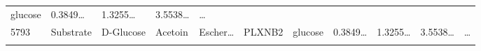 \documentclass[
]{article}
\begin{document}
\begin{longtable}[]{@{}lllllllllll@{}}
\begin{minipage}[t]{0.09\columnwidth}
glucose\strut
\end{minipage} & \begin{minipage}[t]{0.07\columnwidth}\raggedright
0.3849\ldots{}\strut
\end{minipage} & \begin{minipage}[t]{0.07\columnwidth}\raggedright
1.3255\ldots{}\strut
\end{minipage} & \begin{minipage}[t]{0.07\columnwidth}\raggedright
3.5538\ldots{}\strut
\end{minipage} & \begin{minipage}[t]{0.03\columnwidth}\raggedright
\ldots{}\strut
\end{minipage}\tabularnewline
\begin{minipage}[t]{0.03\columnwidth}\raggedright
5793\strut
\end{minipage} & \begin{minipage}[t]{0.07\columnwidth}\raggedright
Substrate\strut
\end{minipage} & \begin{minipage}[t]{0.07\columnwidth}\raggedright
D-Glucose\strut
\end{minipage} & \begin{minipage}[t]{0.09\columnwidth}\raggedright
Acetoin\strut
\end{minipage} & \begin{minipage}[t]{0.07\columnwidth}\raggedright
Escher\ldots{}\strut
\end{minipage} & \begin{minipage}[t]{0.07\columnwidth}\raggedright
PLXNB2\strut
\end{minipage} & \begin{minipage}[t]{0.09\columnwidth}\raggedright
glucose\strut
\end{minipage} & \begin{minipage}[t]{0.07\columnwidth}\raggedright
0.3849\ldots{}\strut
\end{minipage} & \begin{minipage}[t]{0.07\columnwidth}\raggedright
1.3255\ldots{}\strut
\end{minipage} & \begin{minipage}[t]{0.07\columnwidth}\raggedright
3.5538\ldots{}\strut
\end{minipage} & \begin{minipage}[t]{0.03\columnwidth}\raggedright
\ldots{}\strut
\end{minipage}\tabularnewline
\begin{minipage}[t]{0.03\columnwidth}\raggedright

\end{minipage}
\end{longtable}
\end{document}
